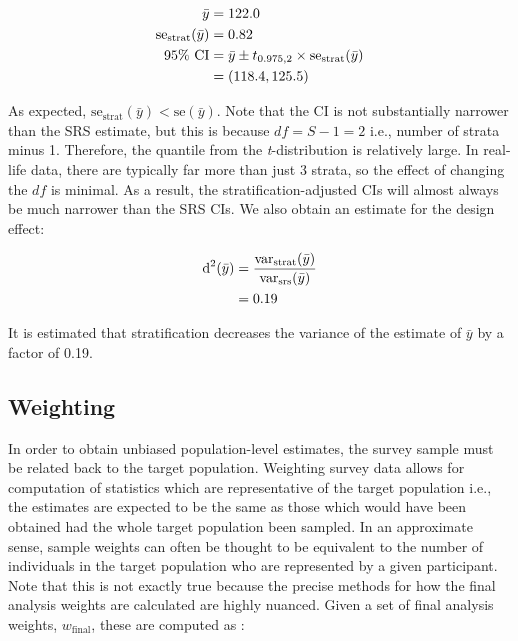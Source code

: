\begin{align}
\label{eq:strat-stats}
\bar{y}					&=		122.0												\\
\notag
\text{se}_{\text{strat}}(\bar{y})	&=		0.82												\\
\notag
95\%\text{ CI}				&=		\bar{y} \pm t_{0.975, 2} \times \text{se}_{\text{strat}}(\bar{y})		\\
\notag
						&=		(118.4, 125.5)
\end{align}

As expected, $\text{se}_{\text{strat}}(\bar{y}) < \text{se}(\bar{y})$. Note that the CI is not substantially narrower than the SRS estimate, but this is because $df = S - 1 = 2$ i.e., number of strata minus 1. Therefore, the quantile from the \emph{t}-distribution is relatively large. In real-life data, there are typically far more than just 3 strata, so the effect of changing the $df$ is minimal. As a result, the stratification-adjusted CIs will almost always be much narrower than the SRS CIs. We also obtain an estimate for the design effect:

\begin{align}
\label{eq:strat-deff}
\notag
\text{d}^{2}(\bar{y})			&=		\frac{\text{var}_{\text{strat}}(\bar{y})}{\text{var}_{\text{srs}}(\bar{y})}	\\
\notag
						&=		0.19													\\
\end{align}

It is estimated that stratification decreases the variance of the estimate of $\bar{y}$ by a factor of 0.19.

\subsection{Weighting}

In order to obtain unbiased population-level estimates, the survey sample must be related back to the target population. Weighting survey data allows for computation of statistics which are representative of the target population i.e., the estimates are expected to be the same as those which would have been obtained had the whole target population been sampled. In an approximate sense, sample weights can often be thought to be equivalent to the number of individuals in the target population who are represented by a given participant. Note that this is not exactly true because the precise methods for how the final analysis weights are calculated are highly nuanced. Given a set of final analysis weights, $w_{\text{final}}$, these are computed as \citep{heeringa2017}:

